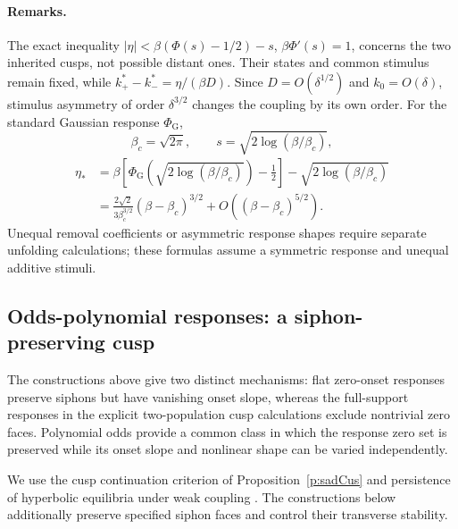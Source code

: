\paragraph{Remarks.}
The exact inequality $|\eta|<\beta(\Phi(s)-1/2)-s$, $\beta \Phi'(s)=1$,
concerns the two inherited cusps, not possible distant ones.
Their states and common stimulus remain fixed, while
$k_+^*-k_-^*=\eta/(\beta D)$. Since $D=O(\delta^{1/2})$ and
$k_0=O(\delta)$, stimulus asymmetry of order $\delta^{3/2}$ changes
the coupling by its own order. For the standard Gaussian response $\Phi_{\mathrm G}$,
\[
 \beta_c=\sqrt{2\pi},\qquad s=\sqrt{2\log(\beta/\beta_c)},
\]
\[
 \begin{aligned}
 \eta_* &=\beta\left[\Phi_{\mathrm G}\!\left(\sqrt{2\log(\beta/\beta_c)}\right)-\tfrac12\right]
 -\sqrt{2\log(\beta/\beta_c)}\\
 &=\frac{2\sqrt2}{3\beta_c^{3/2}}(\beta-\beta_c)^{3/2}
 +O((\beta-\beta_c)^{5/2}).
 \end{aligned}
\]
Unequal removal coefficients or asymmetric response shapes require
separate unfolding calculations; these formulas assume a symmetric
response and unequal additive stimuli.

\subsection{Odds-polynomial responses: a siphon-preserving cusp}
\label{ss:oddsCusp}

The constructions above give two distinct mechanisms: flat zero-onset
responses preserve siphons but have vanishing onset slope, whereas the
full-support responses in the explicit two-population cusp calculations
exclude nontrivial zero faces. Polynomial odds provide a common class in
which the response zero set is preserved while its onset slope and
nonlinear shape can be varied independently.

We use the cusp continuation criterion of Proposition~\ref{p:sadCus}
and persistence of hyperbolic equilibria under weak coupling
\cite{golubitsky2023dynamics,kuznetsov2004,Boud26}.
The constructions below additionally preserve specified siphon faces
and control their transverse stability.

